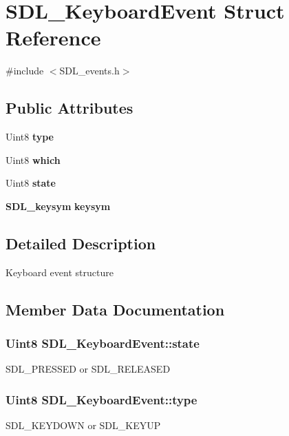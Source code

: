 \section{S\+D\+L\+\_\+\+Keyboard\+Event Struct Reference}
\label{struct_s_d_l___keyboard_event}


{\ttfamily \#include $<$S\+D\+L\+\_\+events.\+h$>$}

\subsection*{Public Attributes}
\begin{DoxyCompactItemize}
\item 
Uint8 {\bf type}
\item 
Uint8 {\bf which}
\item 
Uint8 {\bf state}
\item 
{\bf S\+D\+L\+\_\+keysym} {\bfseries keysym}\label{struct_s_d_l___keyboard_event_aff2459de9aae91c753611b8947af8fc1}

\end{DoxyCompactItemize}


\subsection{Detailed Description}
Keyboard event structure 

\subsection{Member Data Documentation}
\subsubsection[{state}]{\setlength{\rightskip}{0pt plus 5cm}Uint8 S\+D\+L\+\_\+\+Keyboard\+Event\+::state}\label{struct_s_d_l___keyboard_event_a110558eb96c113c86cfa31a7018c2346}
S\+D\+L\+\_\+\+P\+R\+E\+S\+S\+E\+D or S\+D\+L\+\_\+\+R\+E\+L\+E\+A\+S\+E\+D 
\subsubsection[{type}]{\setlength{\rightskip}{0pt plus 5cm}Uint8 S\+D\+L\+\_\+\+Keyboard\+Event\+::type}\label{struct_s_d_l___keyboard_event_a325194806bc8a4a259fc6c610d487293}
S\+D\+L\+\_\+\+K\+E\+Y\+D\+O\+W\+N or S\+D\+L\+\_\+\+K\+E\+Y\+U\+P 
